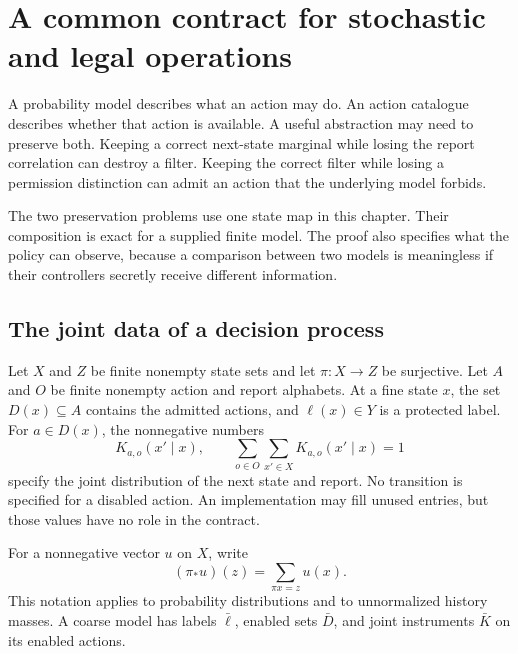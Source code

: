 \chapter{A common contract for stochastic and legal operations}\label{ch:jointcontract}

A probability model describes what an action may do. An action catalogue describes whether that action is available. A useful abstraction may need to preserve both. Keeping a correct next-state marginal while losing the report correlation can destroy a filter. Keeping the correct filter while losing a permission distinction can admit an action that the underlying model forbids.

The two preservation problems use one state map in this chapter. Their composition is exact for a supplied finite model. The proof also specifies what the policy can observe, because a comparison between two models is meaningless if their controllers secretly receive different information.

\section{The joint data of a decision process}
Let $X$ and $Z$ be finite nonempty state sets and let $\pi:X\to Z$ be surjective. Let $A$ and $O$ be finite nonempty action and report alphabets. At a fine state $x$, the set $D(x)\subseteq A$ contains the admitted actions, and $\ell(x)\in Y$ is a protected label. For $a\in D(x)$, the nonnegative numbers
\[
 K_{a,o}(x'\mid x),\qquad
 \sum_{o\in O}\sum_{x'\in X}K_{a,o}(x'\mid x)=1
\]
specify the joint distribution of the next state and report. No transition is specified for a disabled action. An implementation may fill unused entries, but those values have no role in the contract.

For a nonnegative vector $u$ on $X$, write
\[
 (\pi_*u)(z)=\sum_{\pi x=z}u(x).
\]
This notation applies to probability distributions and to unnormalized history masses. A coarse model has labels $\bar\ell$, enabled sets $\bar D$, and joint instruments $\bar K$ on its enabled actions.

